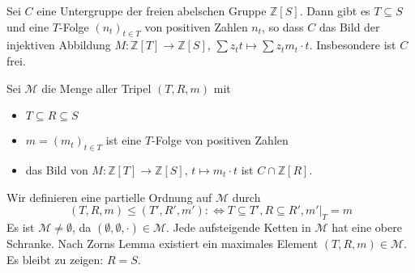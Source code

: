 \begin{lemma}
	Sei $C$ eine Untergruppe der freien abelschen Gruppe $\mathds{Z}[S]$. Dann gibt es $T \subseteq S$ und eine $T$-Folge $(n_t)_{t \in T}$ von positiven Zahlen $n_t$, so dass $C$
	das Bild der injektiven Abbildung $M \colon \mathds{Z}[T] \to \mathds{Z}[S]$, $\sum z_t t \mapsto \sum z_t m_t \cdot t$. Insbesondere ist $C$ frei.
\end{lemma}
\begin{beweis}
	Sei $\mathcal{M}$ die Menge aller Tripel $(T,R,m)$ mit 
	\begin{itemize}
		\item $T \subseteq R \subseteq S$
		\item $m=(m_t)_{t \in T}$ ist eine $T$-Folge von positiven Zahlen
		\item das Bild von $M \colon \mathds{Z}[T] \to \mathds{Z}[S]$, $t \mapsto m_t \cdot t$ ist $C \cap \mathds{Z}[R]$.
	\end{itemize}
	Wir definieren eine partielle Ordnung auf $\mathcal{M}$ durch
	\[
		(T,R,m) \le (T',R',m') :\iff T \subseteq T', R \subseteq R', m'|_{T}=m
	\]
	Es ist $\mathcal{M} \not= \emptyset$, da $(\emptyset,\emptyset, \cdot ) \in \mathcal{M}$. Jede aufsteigende Ketten in $\mathcal{M}$ hat eine obere Schranke. Nach Zorns Lemma 
	existiert ein maximales Element $(T,R,m) \in \mathcal{M}$. Es bleibt zu zeigen: $R=S$.
\end{beweis}






\cleardoubleoddemptypage
{}
\setcounter{page}{1}

\printindex
\listoffigures
\todototoc
{}

